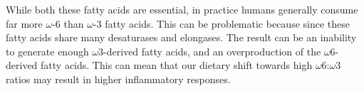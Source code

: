 \documentclass{tufte-handout}
\begin{document}
  While both these fatty acids are essential, in practice humans generally consume far more $\omega$-6  than $\omega$-3 fatty acids.  This can be problematic because since these fatty acids share many desaturases and elongases.  The result can be an inability to generate enough $\omega$3-derived fatty acids, and an overproduction of the $\omega$6-derived fatty acids.  This can mean that our dietary shift towards high $\omega$6:$\omega$3 ratios may result in higher inflammatory responses.



\end{document}
